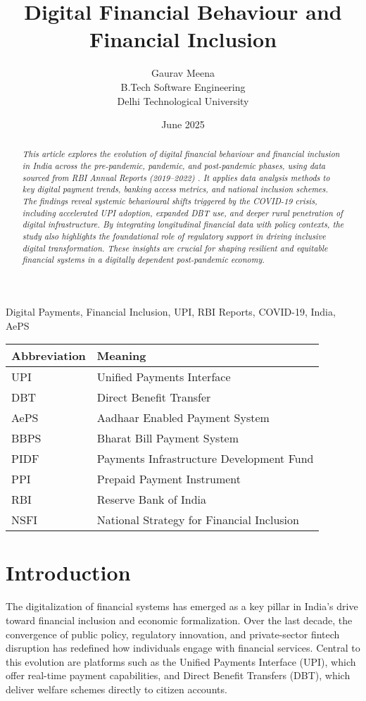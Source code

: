\documentclass[conference]{IEEEtran}
\title{\Large Digital Financial Behaviour and Financial Inclusion}
\author{
    Gaurav Meena \\
    \small B.Tech Software Engineering\\ 
    \small Delhi Technological University
}
\date{June 2025}
\begin{document}
\maketitle

\begin{abstract}
\textit{
    This article explores the evolution of digital financial behaviour and financial inclusion in India across the pre-pandemic, pandemic, and post-pandemic phases, using data sourced from RBI Annual Reports (2019–2022) \cite{rbi2019, rbi2020, rbi2021}. It applies data analysis methods to key digital payment trends, banking access metrics, and national inclusion schemes. The findings reveal systemic behavioural shifts triggered by the COVID-19 crisis, including accelerated UPI adoption, expanded DBT use, and deeper rural penetration of digital infrastructure. By integrating longitudinal financial data with policy contexts, the study also highlights the foundational role of regulatory support in driving inclusive digital transformation. These insights are crucial for shaping resilient and equitable financial systems in a digitally dependent post-pandemic economy.
}
\end{abstract}

\begin{IEEEkeywords}
Digital Payments, Financial Inclusion, UPI, RBI Reports, COVID-19, India, AePS
\end{IEEEkeywords}

\begin{table}[h]
\centering
\begin{tabular}{ll}
\textbf{Abbreviation} & \textbf{Meaning} \\
\hline
UPI & Unified Payments Interface \\
DBT & Direct Benefit Transfer \\
AePS & Aadhaar Enabled Payment System \\
BBPS & Bharat Bill Payment System \\
PIDF & Payments Infrastructure Development Fund \\
PPI & Prepaid Payment Instrument \\
RBI & Reserve Bank of India \\
NSFI & National Strategy for Financial Inclusion \\
\end{tabular}
\end{table}


\section{Introduction}
The digitalization of financial systems has emerged as a key pillar in India’s drive toward financial inclusion and economic formalization. Over the last decade, the convergence of public policy, regulatory innovation, and private-sector fintech disruption has redefined how individuals engage with financial services. Central to this evolution are platforms such as the Unified Payments Interface (UPI), which offer real-time payment capabilities, and Direct Benefit Transfers (DBT), which deliver welfare schemes directly to citizen accounts.
\end{document}

